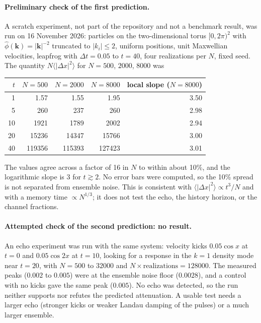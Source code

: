 \documentclass[11pt]{article}
\newcommand{\bk}{\mathbf{k}}
\newcommand{\avg}[1]{\langle #1 \rangle}
\theoremstyle{definition}
\begin{document}
\paragraph{Preliminary check of the first prediction.} A scratch experiment,
not part of the repository and not a benchmark result, was run on
16 November 2026: particles on the two-dimensional torus $[0,2\pi)^2$ with
$\hat\phi(\bk) = |\bk|^{-2}$ truncated to $|k_i|\le 2$, uniform positions,
unit Maxwellian velocities, leapfrog with $\Delta t = 0.05$ to $t = 40$, four
realizations per $N$, fixed seed. The quantity $N\avg{|\Delta x|^2}$ for
$N = 500$, $2000$, $8000$ was
\begin{center}
\begin{tabular}{rrrrr}
  $t$ & $N=500$ & $N=2000$ & $N=8000$ & local slope ($N=8000$) \\ \hline
  1  & 1.57 & 1.55 & 1.95 & 3.50 \\
  5  & 260 & 237 & 260 & 2.98 \\
  10 & 1921 & 1789 & 2002 & 2.94 \\
  20 & 15236 & 14347 & 15766 & 3.00 \\
  40 & 119356 & 115393 & 127423 & 3.01 \\
\end{tabular}
\end{center}
The values agree across a factor of 16 in $N$ to within about 10\%, and the
logarithmic slope is 3 for $t\gtrsim 2$. No error bars were computed, so the
10\% spread is not separated from ensemble noise. This is consistent with
$\avg{|\Delta x|^2}\propto t^3/N$ and with a memory time
$\propto N^{1/3}$; it does not test the echo, the history horizon, or the
channel fractions.

\paragraph{Attempted check of the second prediction: no result.} An echo
experiment was run with the same system: velocity kicks
$0.05\cos x$ at $t=0$ and $0.05\cos 2x$ at $t=10$, looking for a response in
the $k=1$ density mode near $t=20$, with $N = 500$ to $32000$ and
$N\times\text{realizations} = 128000$. The measured peaks ($0.002$ to
$0.005$) were at the ensemble noise floor ($0.0028$), and a control with no
kicks gave the same peak ($0.005$). No echo was detected, so the run neither
supports nor refutes the predicted attenuation. A usable test needs a larger
echo (stronger kicks or weaker Landau damping of the pulses) or a much larger
ensemble.
\end{document}
